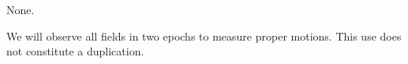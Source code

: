 \documentclass[12pt]{article}
\begin{document}

%
%
\coordinatedobs          %
\vspace{-0.5cm}
None.


%
%
\duplications           %
\vspace{-0.5cm}
We will observe all fields in two epochs to measure proper motions.
This use does not constitute a duplication.



\pagebreak
\printbibliography
\end{document}
